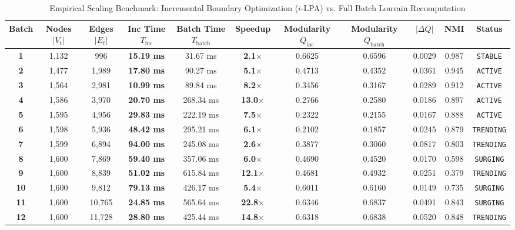 \documentclass[10pt,journal,compsoc]{IEEEtran}
\begin{document}
\begin{table}[t]
\centering
\caption{Empirical Scaling Benchmark: Incremental Boundary Optimization ($i$-LPA) vs. Full Batch Louvain Recomputation}
\label{tab:empirical_benchmarks}
\begin{tabular}{ccccccccccc}
\toprule
\textbf{Batch} & \textbf{Nodes} $|V_t|$ & \textbf{Edges} $|E_t|$ & \textbf{Inc Time} $T_{\text{inc}}$ & \textbf{Batch Time} $T_{\text{batch}}$ & \textbf{Speedup} & \textbf{Modularity} $Q_{\text{inc}}$ & \textbf{Modularity} $Q_{\text{batch}}$ & $|\Delta Q|$ & \textbf{NMI} & \textbf{Status} \\
\midrule
\textbf{1}  & 1,132 & 996    & \textbf{15.19 ms} & 31.67 ms  & \textbf{2.1$\times$}  & 0.6625 & 0.6596 & 0.0029 & 0.987 & \texttt{STABLE} \\
\textbf{2}  & 1,477 & 1,989  & \textbf{17.80 ms} & 90.27 ms  & \textbf{5.1$\times$}  & 0.4713 & 0.4352 & 0.0361 & 0.945 & \texttt{ACTIVE} \\
\textbf{3}  & 1,564 & 2,981  & \textbf{10.99 ms} & 89.84 ms  & \textbf{8.2$\times$}  & 0.3456 & 0.3167 & 0.0289 & 0.912 & \texttt{ACTIVE} \\
\textbf{4}  & 1,586 & 3,970  & \textbf{20.70 ms} & 268.34 ms & \textbf{13.0$\times$} & 0.2766 & 0.2580 & 0.0186 & 0.897 & \texttt{ACTIVE} \\
\textbf{5}  & 1,595 & 4,956  & \textbf{29.83 ms} & 222.19 ms & \textbf{7.5$\times$}  & 0.2322 & 0.2155 & 0.0167 & 0.888 & \texttt{ACTIVE} \\
\textbf{6}  & 1,598 & 5,936  & \textbf{48.42 ms} & 295.21 ms & \textbf{6.1$\times$}  & 0.2102 & 0.1857 & 0.0245 & 0.879 & \texttt{TRENDING} \\
\textbf{7}  & 1,599 & 6,894  & \textbf{94.00 ms} & 245.08 ms & \textbf{2.6$\times$}  & 0.3877 & 0.3060 & 0.0817 & 0.803 & \texttt{TRENDING} \\
\textbf{8}  & 1,600 & 7,869  & \textbf{59.40 ms} & 357.06 ms & \textbf{6.0$\times$}  & 0.4690 & 0.4520 & 0.0170 & 0.598 & \texttt{SURGING} \\
\textbf{9}  & 1,600 & 8,839  & \textbf{51.02 ms} & 615.84 ms & \textbf{12.1$\times$} & 0.4681 & 0.4932 & 0.0251 & 0.379 & \texttt{TRENDING} \\
\textbf{10} & 1,600 & 9,812  & \textbf{79.13 ms} & 426.17 ms & \textbf{5.4$\times$}  & 0.6011 & 0.6160 & 0.0149 & 0.735 & \texttt{SURGING} \\
\textbf{11} & 1,600 & 10,765 & \textbf{24.85 ms} & 565.64 ms & \textbf{22.8$\times$} & 0.6346 & 0.6837 & 0.0491 & 0.843 & \texttt{SURGING} \\
\textbf{12} & 1,600 & 11,728 & \textbf{28.80 ms} & 425.44 ms & \textbf{14.8$\times$} & 0.6318 & 0.6838 & 0.0520 & 0.848 & \texttt{TRENDING} \\
\bottomrule
\end{tabular}
\end{table}
\end{document}
